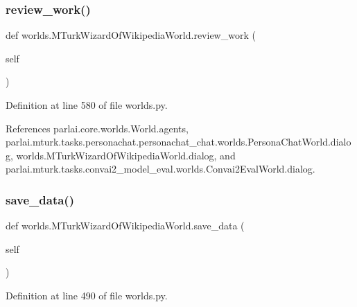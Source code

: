 \subsubsection{\texorpdfstring{review\+\_\+work()}{review\_work()}}
{\footnotesize\ttfamily def worlds.\+M\+Turk\+Wizard\+Of\+Wikipedia\+World.\+review\+\_\+work (\begin{DoxyParamCaption}\item[{}]{self }\end{DoxyParamCaption})}



Definition at line 580 of file worlds.\+py.



References parlai.\+core.\+worlds.\+World.\+agents, parlai.\+mturk.\+tasks.\+personachat.\+personachat\+\_\+chat.\+worlds.\+Persona\+Chat\+World.\+dialog, worlds.\+M\+Turk\+Wizard\+Of\+Wikipedia\+World.\+dialog, and parlai.\+mturk.\+tasks.\+convai2\+\_\+model\+\_\+eval.\+worlds.\+Convai2\+Eval\+World.\+dialog.

\mbox{\label{classworlds_1_1MTurkWizardOfWikipediaWorld_a9b43063f4245fde1798b4736cf236aa0}} 
\subsubsection{\texorpdfstring{save\+\_\+data()}{save\_data()}}
{\footnotesize\ttfamily def worlds.\+M\+Turk\+Wizard\+Of\+Wikipedia\+World.\+save\+\_\+data (\begin{DoxyParamCaption}\item[{}]{self }\end{DoxyParamCaption})}



Definition at line 490 of file worlds.\+py.



